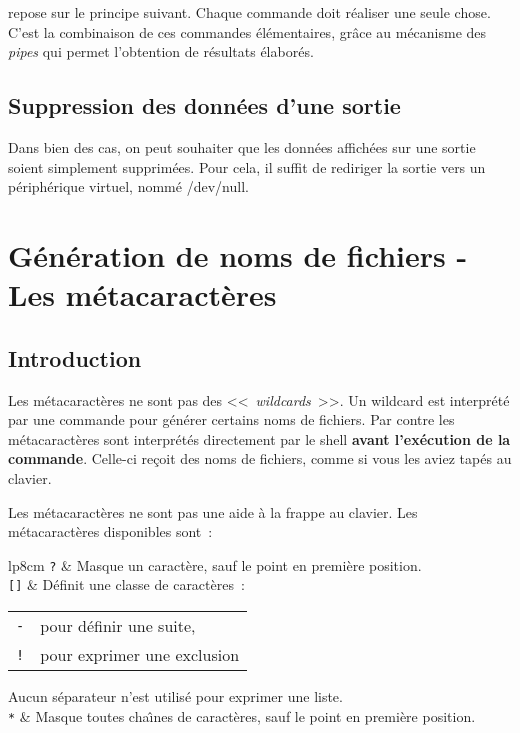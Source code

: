 {\Unix} repose sur le principe suivant. Chaque commande doit r{\'e}aliser
une seule chose. C'est la combinaison de ces commandes {\'e}l{\'e}mentaires,
gr{\^a}ce au m{\'e}canisme des \textsl{pipes} qui permet l'obtention de r{\'e}sultats
{\'e}labor{\'e}s.

\subsection{Suppression des donn{\'e}es d'une sortie}

Dans bien des cas, on peut souhaiter que les donn{\'e}es affich{\'e}es sur une sortie soient 
simplement supprim{\'e}es. Pour cela, il suffit de rediriger la sortie vers un p{\'e}riph{\'e}rique
virtuel, nomm{\'e} /dev/null. 
\begin{center}
\end{center}


\section{\label{basic-metacars}G{\'e}n{\'e}ration de noms de fichiers - Les m{\'e}tacaract{\`e}res}

\subsection{Introduction}

Les m{\'e}tacaract{\`e}res ne sont pas des
<<~\textsl{wildcards}~>>. Un wildcard est
interpr{\'e}t{\'e} par une commande pour g{\'e}n{\'e}rer certains noms
de fichiers. Par contre les m{\'e}tacaract{\`e}res sont
interpr{\'e}t{\'e}s directement par le shell \textbf{avant
l'ex{\'e}cution de la commande}. Celle-ci re\c{c}oit des noms de
fichiers, comme si vous les aviez tap{\'e}s au clavier.

Les m{\'e}tacaract{\`e}res ne sont pas une aide {\`a} la frappe au clavier.
Les m{\'e}tacaract{\`e}res disponibles sont~:~\\
\begin{tabular}{lp{8cm}}
	\texttt{?}		&
	Masque un caract{\`e}re, sauf le point en premi{\`e}re position.\\[0.5cm]
	\texttt{[]}		&
	D{\'e}finit une classe de caract{\`e}res~:
	\begin{tabular}{lp{5cm}}
		\index{-@\texttt{-}}\texttt{-}	& pour d{\'e}finir une suite,\\
		\index{!@\texttt{!}}\texttt{!}	& pour exprimer une exclusion
	\end{tabular}
	Aucun s{\'e}parateur n'est utilis{\'e} pour exprimer une liste.\\[0.5cm]
	\texttt{*}		&
	Masque toutes cha{\^\i}nes de caract{\`e}res, sauf le point en premi{\`e}re position.
\end{tabular}

